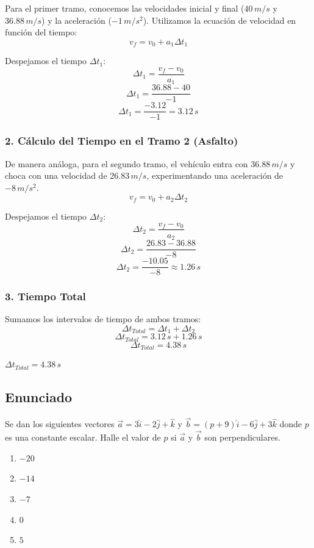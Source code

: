 \documentclass[12pt, a4paper]{article}
\begin{document}
Para el primer tramo, conocemos las velocidades inicial y final ($40 \, \si{m/s}$ y $36.88 \, \si{m/s}$) y la aceleración ($-1 \, \si{m/s^2}$). Utilizamos la ecuación de velocidad en función del tiempo:
$$ v_f = v_0 + a_1\Delta t_1 $$

Despejamos el tiempo $\Delta t_1$:
$$ \Delta t_1 = \frac{v_f - v_0}{a_1} $$
$$ \Delta t_1 = \frac{36.88 - 40}{-1} $$
$$ \Delta t_1 = \frac{-3.12}{-1} = 3.12 \, \si{s} $$

\subsubsection*{2. Cálculo del Tiempo en el Tramo 2 (Asfalto)}
De manera análoga, para el segundo tramo, el vehículo entra con $36.88 \, \si{m/s}$ y choca con una velocidad de $26.83 \, \si{m/s}$, experimentando una aceleración de $-8 \, \si{m/s^2}$.
$$ v_f = v_0 + a_2\Delta t_2 $$

Despejamos el tiempo $\Delta t_2$:
$$ \Delta t_2 = \frac{v_f - v_0}{a_2} $$
$$ \Delta t_2 = \frac{26.83 - 36.88}{-8} $$
$$ \Delta t_2 = \frac{-10.05}{-8} \approx 1.26 \, \si{s} $$

\subsubsection*{3. Tiempo Total}
Sumamos los intervalos de tiempo de ambos tramos:
$$ \Delta t_{Total} = \Delta t_1 + \Delta t_2 $$
$$ \Delta t_{Total} = 3.12 \, \si{s} + 1.26 \, \si{s} $$
$$ \Delta t_{Total} = 4.38 \, \si{s} $$

\begin{tcolorbox}[colback=green!5!white, colframe=green!50!black, title=Respuesta Final]
\centering \Large $\Delta t_{Total} = 4.38 \, \si{s}$
\end{tcolorbox}

\newpage

\subsection*{Enunciado}
Se dan los siguientes vectores $\vec{a} = 3\hat{i} - 2\hat{j} + \hat{k}$ y $\vec{b} = (p + 9)\hat{i} - 6\hat{j} + 3\hat{k}$ donde $p$ es una constante escalar. Halle el valor de $p$ si $\vec{a}$ y $\vec{b}$ son perpendiculares.

\begin{enumerate}[label=\alph*)]
    \item $-20$
    \item $-14$
    \item $-7$
    \item $0$
    \item $5$
\end{enumerate}
\end{document}
